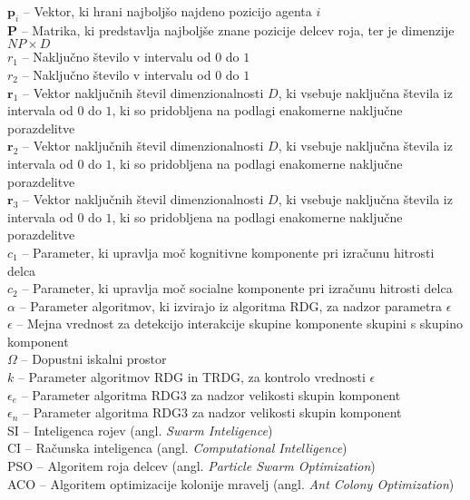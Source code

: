 $\mathbf{p}_i$ -- Vektor, ki hrani najboljšo najdeno pozicijo agenta $i$ \\
$\mathbf{P}$ -- Matrika, ki predstavlja najboljše znane pozicije delcev roja, ter je dimenzije $\mathit{NP} \times \mathit{D}$ \\
$r_1$ -- Naključno število v intervalu od $0$ do $1$ \\
$r_2$ -- Naključno število v intervalu od $0$ do $1$ \\
$\mathbf{r}_1$ -- Vektor naključnih števil dimenzionalnosti $\mathit{D}$, ki vsebuje naključna števila iz intervala od $0$ do $1$, ki so pridobljena na podlagi enakomerne naključne porazdelitve \\
$\mathbf{r}_2$ -- Vektor naključnih števil dimenzionalnosti $\mathit{D}$, ki vsebuje naključna števila iz intervala od $0$ do $1$, ki so pridobljena na podlagi enakomerne naključne porazdelitve \\
$\mathbf{r}_3$ -- Vektor naključnih števil dimenzionalnosti $\mathit{D}$, ki vsebuje naključna števila iz intervala od $0$ do $1$, ki so pridobljena na podlagi enakomerne naključne porazdelitve \\
$c_1$ -- Parameter, ki upravlja moč kognitivne komponente pri izračunu hitrosti delca \\
$c_2$ -- Parameter, ki upravlja moč socialne komponente pri izračunu hitrosti delca \\
$\alpha$ -- Parameter algoritmov, ki izvirajo iz algoritma RDG, za nadzor parametra $\epsilon$  \\
$\epsilon$ -- Mejna vrednost za detekcijo interakcije skupine komponente skupini s skupino komponent \\
$\Omega$ -- Dopustni iskalni prostor \\
$k$ -- Parameter algoritmov RDG in TRDG, za kontrolo vrednosti $\epsilon$ \\
$\epsilon_e$ -- Parameter algoritma RDG3 za nadzor velikosti skupin komponent \\
$\epsilon_n$ -- Parameter algoritma RDG3 za nadzor velikosti skupin komponent \\
SI -- Inteligenca rojev (angl. \textit{Swarm Inteligence}) \\
CI -- Računska inteligenca (angl. \textit{Computational Intelligence}) \\
PSO -- Algoritem roja delcev (angl. \textit{Particle Swarm Optimization}) \\
ACO -- Algoritem optimizacije kolonije mravelj (angl. \textit{Ant Colony Optimization}) \\

